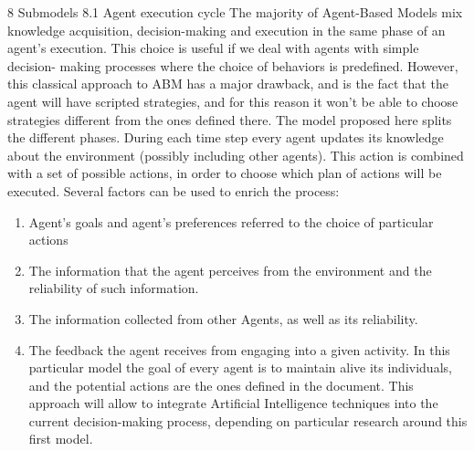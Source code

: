 8
Submodels
8.1 Agent execution cycle
The majority of Agent-Based Models mix knowledge acquisition, decision-making and execution in the
same phase of an agent's execution. This choice is useful if we deal with agents with simple decision-
making processes where the choice of behaviors is predefined. However, this classical approach to
ABM has a major drawback, and is the fact that the agent will have scripted strategies, and for this
reason it won't be able to choose strategies different from the ones defined there.
The model proposed here splits the different phases. During each time step every agent updates its
knowledge about the environment (possibly including other agents). This action is combined with a set
of possible actions, in order to choose which plan of actions will be executed. Several factors can be
used to enrich the process:
\begin{enumerate}
	\item Agent's goals and agent's preferences referred to the choice of particular actions
	\item The information that the agent perceives from the environment and the reliability of such
	information.
	\item The information collected from other Agents, as well as its reliability.
	\item The feedback the agent receives from engaging into a given activity.
	In this particular model the goal of every agent is to maintain alive its individuals, and the potential
	actions are the ones defined in the document. This approach will allow to integrate Artificial
	Intelligence techniques into the current decision-making process, depending on particular research
	around this first model.
\end{enumerate}


